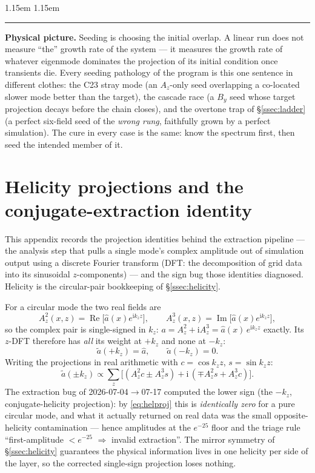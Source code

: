 \documentclass[11pt,a4paper]{article}
\numberwithin{equation}{section}
\theoremstyle{remark}
\newenvironment{intuition}%
{\par\medskip\noindent
 \begin{list}{}{\leftmargin 1.15em \rightmargin 1.15em \listparindent 0pt
 \itemindent 0pt \parsep 2pt \topsep 2pt}\item\relax
 \small\textcolor{intu}{\rule[-0.6ex]{2.6pt}{2.4ex}}\hspace{0.55em}%
 \textcolor{intu}{\textbf{Physical picture.}}\hspace{0.5em}\ignorespaces}%
{\end{list}\medskip}
\newcommand{\kz}{k_z}
\newcommand{\ii}{\mathrm{i}}
\newcommand{\Rey}{\operatorname{Re}}
\newcommand{\Imy}{\operatorname{Im}}
\begin{document}
\begin{intuition}
Seeding is choosing the initial overlap. A linear run does not measure
``the'' growth rate of the system --- it measures the growth rate of
whatever eigenmode dominates the projection of its initial condition
once transients die. Every seeding pathology of the program is this one
sentence in different clothes: the C23 stray mode (an $A_z$-only seed
overlapping a co-located slower mode better than the target), the
cascade race (a $B_y$ seed whose target projection decays before the
chain closes), and the overtone trap of \S\ref{ssec:ladder} (a perfect
six-field seed of the \emph{wrong rung}, faithfully grown by a perfect
simulation). The cure in every case is the same: know the spectrum
first, then seed the intended member of it.
\end{intuition}

\clearpage
\appendix

\section{Helicity projections and the conjugate-extraction identity}
\label{app:helicity}

This appendix records the projection identities behind the extraction
pipeline --- the analysis step that pulls a single mode's complex
amplitude out of simulation output using a discrete Fourier transform
(DFT: the decomposition of grid data into its sinusoidal
$z$-components) --- and the sign bug those identities diagnosed.
Helicity is the circular-pair bookkeeping of \S\ref{ssec:helicity}.

For a circular mode the two real fields are
\begin{equation}
A_z^2(x,z)=\Rey\bigl[\hat a(x)e^{\ii\kz z}\bigr],\qquad
A_z^3(x,z)=\Imy\bigl[\hat a(x)e^{\ii\kz z}\bigr],
\end{equation}
so the complex pair is single-signed in $\kz$:
$a=A_z^2+\ii A_z^3=\hat a(x)\,e^{\ii\kz z}$ exactly. Its $z$-DFT
therefore has \emph{all} its weight at $+\kz$ and none at $-\kz$:
\begin{equation}
\tilde a(+\kz)=\hat a,\qquad \tilde a(-\kz)=0 .
\label{eq:helproj}
\end{equation}
Writing the projections in real arithmetic with $c=\cos\kz z$,
$s=\sin\kz z$:
\begin{equation}
\tilde a(\pm\kz)\propto\sum_z\bigl[(A_z^2c\pm A_z^3s)
+\ii\,(\mp A_z^2s+A_z^3c)\bigr].
\end{equation}
The extraction bug of 2026-07-04$\to$07-17 computed the lower sign (the
$-\kz$, conjugate-helicity projection): by \eqref{eq:helproj} this is
\emph{identically zero} for a pure circular mode, and what it actually
returned on real data was the small opposite-helicity contamination ---
hence amplitudes at the $e^{-25}$ floor and the triage rule
``first-amplitude $<e^{-25}$ $\Rightarrow$ invalid extraction''. The
mirror symmetry of \S\ref{ssec:helicity} guarantees the physical
information lives in one helicity per side of the layer, so the corrected
single-sign projection loses nothing.
\end{document}
